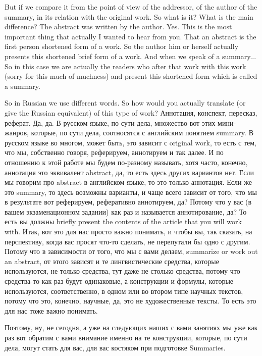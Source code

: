 \documentclass[main.tex]{subfiles}
\begin{document}
But if we compare it from the point of view of the addressor, of the author of the summary, in its relation with the original work.
So what is it?
What is the main difference?
The abstract was written by the author. Yes.
This is the most important thing that actually I wanted to hear from you.
That an abstract is the first person shortened form of a work.
So the author him or herself actually presents this shortened brief form of a work.
And when we speak of a summary...
So in this case we are actually the readers who after that work with this work (sorry for this much of muchness) and present this shortened form which is called a summary.

So in Russian we use different words.
So how would you actually translate (or give the Russian equivalent) of this type of work?
Аннотация, конспект, пересказ, реферат.
Да, да.
В русском языке, по сути дела, множество вот этих мини-жанров, которые, по сути дела, соотносятся с английским понятием summary.
В русском языке во многом, может быть, это зависит с original work, то есть с тем, что мы, собственно говоря, реферируем, аннотируем и так далее.
И по отношению к этой работе мы будем по-разному называть, хотя часто, конечно, аннотация это эквивалент abstract, да, то есть здесь других вариантов нет.
Если мы говорим про abstract в английском языке, то это только аннотация.
Если же это summary, то здесь возможны варианты, и чаще всего зависит от того, что мы в результате вот реферируем, реферативно аннотируем, да?
Потому что у вас (в вашем экзаменационном задании) как раз и называется аннотирование, да?
То есть вы должны briefly present the contents of the article that you will work with.
Итак, вот это для нас просто важно понимать, и чтобы вы, так сказать, на перспективу, когда вас просят что-то сделать, не перепутали бы одно с другим.
Потому что в зависимости от того, что мы с вами делаем, summarize or work out an abstract, от этого зависят и те лингвистические средства, которые используются, не только средства, тут даже не столько средства, потому что средства-то как раз будут одинаковые, а конструкции и формулы, которые используются, соответственно, в одном или во втором типе научных текстов, потому что это, конечно, научные, да, это не художественные тексты.
То есть это для нас тоже важно понимать.

Поэтому, ну, не сегодня, а уже на следующих наших с вами занятиях мы уже как раз вот обратим с вами внимание именно на те конструкции, которые, по сути дела, могут стать для вас, для вас костяком при подготовке Summaries.
\end{document}
